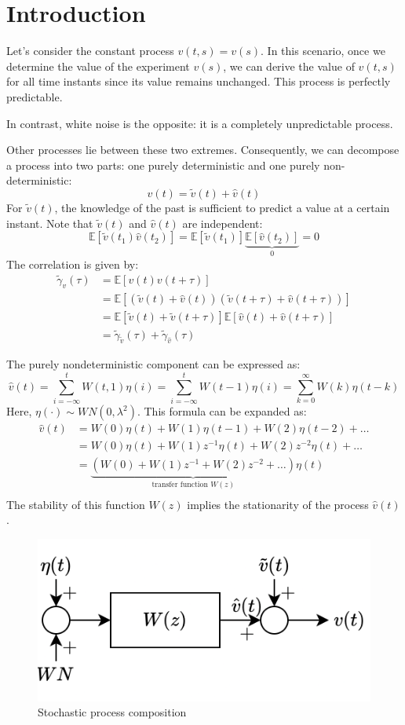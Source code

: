 \section{Introduction}

Let's consider the constant process $v(t,s)=v(s)$. 
In this scenario, once we determine the value of the experiment $v(s)$, we can derive the value of $v(t,s)$ for all time instants since its value remains unchanged.
This process is perfectly predictable.

In contrast, white noise is the opposite: it is a completely unpredictable process. 

Other processes lie between these two extremes.
Consequently, we can decompose a process into two parts: one purely deterministic and one purely non-deterministic:
\[v(t)=\tilde{v}(t)+\hat{v}(t)\]
For $\tilde{v}(t)$, the knowledge of the past is sufficient to predict a value at a certain instant.
Note that $\tilde{v}(t)$ and $\hat{v}(t)$ are independent: 
\[\mathbb{E}\left[ \tilde{v}(t_1)\hat{v}(t_2) \right]=\mathbb{E}\left[ \tilde{v}(t_1)\right]\underbrace{\mathbb{E}\left[\hat{v}(t_2) \right]}_0 =0\]
The correlation is given by:
\begin{align*}
    \tilde{\gamma}_v(\tau)  &=\mathbb{E}\left[v(t)v(t+\tau)\right] \\
                            &=\mathbb{E}\left[\left(\tilde{v}(t)+\hat{v}(t)\right)\left(\tilde{v}(t+\tau)+\hat{v}(t+\tau)\right)\right] \\
                            &=\mathbb{E}\left[\tilde{v}(t)+\tilde{v}(t+\tau)\right]\mathbb{E}\left[\hat{v}(t)+\hat{v}(t+\tau)\right] \\
                            &=\tilde{\gamma}_{\tilde{v}}(\tau)+\tilde{\gamma}_{\hat{v}}(\tau)
\end{align*}

The purely nondeterministic component can be expressed as:
\[\hat{v}(t)=\sum_{i=-\infty}^{t}W(t,1)\eta(i)=\sum_{i=-\infty}^{t}W(t-1)\eta(i)=\sum_{k=0}^\infty W(k)\eta(t-k)\]
Here, $\eta(\cdot) \sim WN(0,\lambda^2)$. 
This formula can be expanded as:
\begin{align*}
\hat{v}(t)  &= W(0)\eta(t) + W(1)\eta(t-1) + W(2)\eta(t-2) + \dots \\
                &= W(0)\eta(t) + W(1)z^{-1}\eta(t) + W(2)z^{-2}\eta(t) + \dots \\
                &= \underbrace{\left(W(0) + W(1)z^{-1} + W(2)z^{-2} + \dots\right)}_{\text{transfer function }W(z)} \eta(t)  \\
\end{align*}
The stability of this function $W(z)$ implies the stationarity of the process $\hat{v}(t)$.
\begin{figure}[H]
    \centering
    \includegraphics[width=0.4\linewidth]{images/dynamic.png} 
    \caption{Stochastic process composition}
\end{figure}